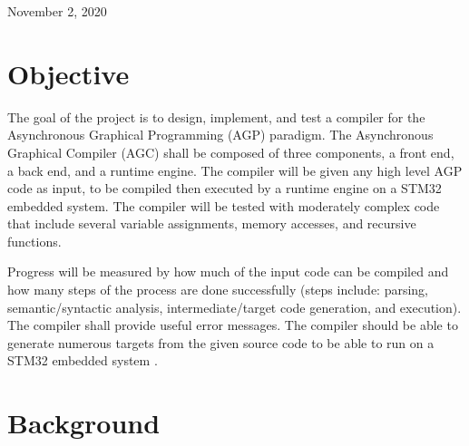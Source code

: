 \documentclass[11pt]{article}
\begin{document}
\begin{titlepage}
	\vfill\vfill\vfill %
	
	{\large
	November 2, 2020} 
	
	
	 
	
	\vfill %
	
\end{titlepage}


\tableofcontents

\pagebreak

\section{Objective}
   
The goal of the project is to design, implement, and test a compiler for  the Asynchronous Graphical Programming (AGP) paradigm. The Asynchronous Graphical Compiler (AGC) shall be composed of  three components, a front end, a back end, and a runtime engine. The compiler will be given any high level AGP code as input, to be compiled then executed by a runtime engine on a STM32 embedded system. The compiler will be tested with moderately complex code that include several variable assignments, memory accesses, and recursive functions.

Progress will be measured by how much of the input code can be compiled and how many steps of the process are done successfully (steps include: parsing, semantic/syntactic analysis, intermediate/target code generation, and execution). The compiler shall provide useful error messages. The compiler should be able to generate numerous targets from the given source code to be able to run on a STM32 embedded system
.


\section{Background}
       
\end{document}
